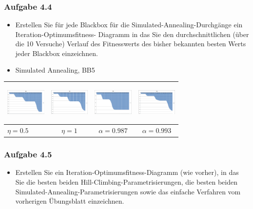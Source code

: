 \documentclass[xcolor=pdftex,dvipsnames,table]{beamer}
\begin{document}
\begin{frame}
  \frametitle{Aufgabe 4.4}
  \begin{itemize}
  		\item Erstellen Sie für jede Blackbox für die Simulated-Annealing-Durchgänge ein Iteration-Optimumsfitness-
Diagramm in das Sie den durchschnittlichen (über die 10 Versuche) Verlauf des Fitnesswerts
des bisher bekannten besten Werts jeder Blackbox einzeichnen.
\item Simulated Annealing, BB5
  \end{itemize}

\begin{tabular}{|l|c|c|c|} 
      \rowcolor[HTML]{CCD6CC}	
      \includegraphics[width=20mm, height=20mm]{img/excel_avg_and_charts/pic/BB5_SimulatedAnnealing_t1_eta_0_5.png} 
 &  \includegraphics[width=20mm, height=20mm]{img/excel_avg_and_charts/pic/BB5_SimulatedAnnealing_t1_eta_1.png} 
 &  \includegraphics[width=20mm, height=20mm]{img/excel_avg_and_charts/pic/BB5_SimulatedAnnealing_t2_alpha__987.png}
 &  \includegraphics[width=20mm, height=20mm]{img/excel_avg_and_charts/pic/BB5_SimulatedAnnealing_t2_alpha_0_993.png} \\ \hline
      \rowcolor[HTML]{A6BFB9} $\eta = 0.5$ & $\eta = 1$ & $\alpha = 0.987$ & $\alpha = 0.993$ \\ \hline
    \end{tabular}
    
\end{frame}

\begin{frame}
  \frametitle{Aufgabe 4.5}
  \begin{itemize}
  		\item Erstellen Sie ein Iteration-Optimumsfitness-Diagramm (wie vorher), in das Sie die besten beiden
Hill-Climbing-Parametrisierungen, die besten beiden Simulated-Annealing-Parametrisierungen sowie
das einfache Verfahren vom vorherigen Übungsblatt einzeichnen.
  \end{itemize}
\end{frame}
\end{document}
